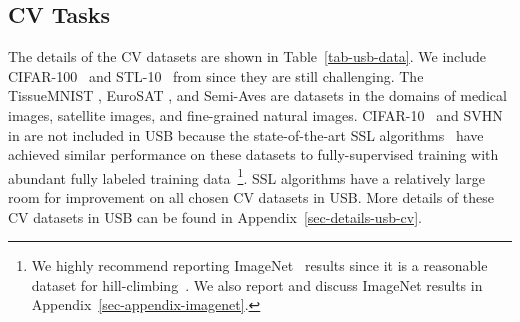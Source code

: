 \documentclass{article}
\newcommand{\revision}[1]{{\color{black}{#1}}}
\begin{document}
\subsection{CV Tasks}


The details of the CV datasets are shown in Table~\ref{tab-usb-data}.
We include CIFAR-100~\cite{krizhevsky2009learning} and STL-10~\cite{coates2011analysis} from \revision{TorchSSL} since they are still challenging.
The TissueMNIST \cite{medmnistv1,medmnistv2}, EuroSAT \cite{helber2019eurosat,helber2018introducing}, and Semi-Aves \cite{su2021semi} are datasets in the domains of medical images, satellite images, and fine-grained natural images.
CIFAR-10~\cite{krizhevsky2009learning} and SVHN~\cite{netzer2011reading} in \revision{TorchSSL} are not included in USB because the state-of-the-art SSL algorithms~\cite{xie2020unsupervised,sohn2020fixmatch,xu2021dash} have achieved similar performance on these datasets to fully-supervised training with abundant fully labeled training data~\footnote{We highly recommend reporting ImageNet~\cite{ILSVRC15} results since it is a reasonable dataset for hill-climbing~\cite{sohn2020fixmatch,zheng2022simmatch,zhang2021flexmatch}. We also report and discuss ImageNet results in Appendix~\ref{sec-appendix-imagenet}.}.
SSL algorithms have a relatively large room for improvement on all chosen CV datasets in USB.
More details of these CV datasets in USB can be found in Appendix~\ref{sec-details-usb-cv}.
\end{document}
